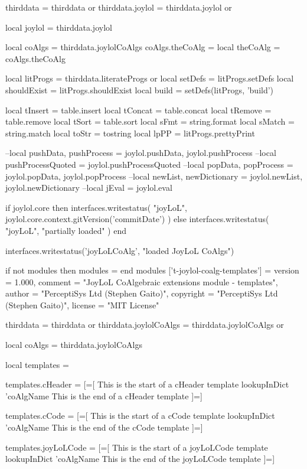 thirddata         = thirddata        or {}
thirddata.joylol  = thirddata.joylol or {}

local joylol      = thirddata.joylol

local coAlgs      = thirddata.joylolCoAlgs
coAlgs.theCoAlg   = {}
local theCoAlg    = coAlgs.theCoAlg

local litProgs    = thirddata.literateProgs or {}
local setDefs     = litProgs.setDefs
local shouldExist = litProgs.shouldExist
local build       = setDefs(litProgs, 'build')

local tInsert = table.insert
local tConcat = table.concat
local tRemove = table.remove
local tSort   = table.sort
local sFmt    = string.format
local sMatch  = string.match
local toStr   = tostring
local lpPP    = litProgs.prettyPrint

--local pushData, pushProcess = joylol.pushData, joylol.pushProcess
--local pushProcessQuoted = joylol.pushProcessQuoted
--local popData, popProcess   = joylol.popData, joylol.popProcess
--local newList, newDictionary = joylol.newList, joylol.newDictionary
--local jEval = joylol.eval

if joylol.core then
  interfaces.writestatus(
    "joyLoL",
    joylol.core.context.gitVersion('commitDate')
  )
else
  interfaces.writestatus(
    "joyLoL",
    "partially loaded"
  )
end

interfaces.writestatus('joyLoLCoAlg', "loaded JoyLoL CoAlgs")
\stopLuaCode

\startLuaTemplate
if not modules then modules = { } end modules ['t-joylol-coalg-templates'] = {
    version   = 1.000,
    comment   = "JoyLoL CoAlgebraic extensions module - templates",
    author    = "PerceptiSys Ltd (Stephen Gaito)",
    copyright = "PerceptiSys Ltd (Stephen Gaito)",
    license   = "MIT License"
}

thirddata              = thirddata              or {}
thirddata.joylolCoAlgs = thirddata.joylolCoAlgs or {}

local coAlgs     = thirddata.joylolCoAlgs

local templates  = { }

templates.cHeader = [=[
This is the start of a cHeader template
{{ lookupInDict 'coAlgName }}
This is the end of a cHeader template
]=]

templates.cCode = [=[
This is the start of a cCode template
{{ lookupInDict 'coAlgName }}
This is the end of the cCode template
]=]

templates.joyLoLCode = [=[
This is the start of a joyLoLCode template
{{ lookupInDict 'coAlgName }}
This is the end of the joyLoLCode template
]=]

